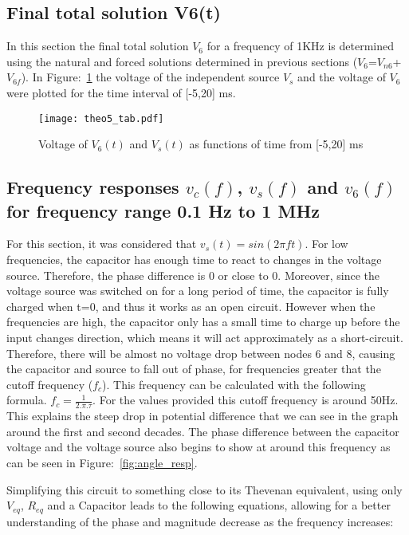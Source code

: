 \pagebreak
\subsection{Final total solution V6(t)}
In this section the final total solution $V_6$ for a frequency of 1KHz is determined using the natural and forced solutions determined in previous sections ($V_6$=$V_{n6}$+$V_{6f}$). In {Figure:~\ref{fig:theo5}} the voltage of the independent source $V_{s}$ and the voltage of $V_{6}$ were plotted for the time interval of [-5,20] ms. 
\begin{figure}[H] \centering
\texttt{[image: theo5\_tab.pdf]}
\vspace{10px}
\caption{Voltage of $V_{6}(t)$ and $V_{s}(t)$ as functions of time from [-5,20] ms}
\label{fig:theo5}
\end{figure}

\subsection{Frequency responses $v_c(f)$, $v_s(f)$ and $v_6(f)$ for frequency range 0.1 Hz to 1 MHz}
\label{ref}
For this section, it was considered that $v_s( t) = sin( 2 \pi f t )$. 
For low frequencies, the capacitor has enough time to react to changes in the voltage source. Therefore, the phase difference is 0 or close to 0. Moreover, since the voltage source was switched on for a long period of time, the capacitor is fully charged when t=0, and thus it works as an open circuit. However when the frequencies are high, the capacitor only has a small time to charge up before the input changes direction, which means it will act approximately as a short-circuit. Therefore, there will be almost no 
voltage drop between nodes 6 and 8, causing the capacitor and source to fall out of phase, for frequencies greater that the cutoff frequency ($f_c$). 
This frequency can be calculated with the following formula. $f_c = \frac{1}{2.\pi.\tau}$.  
For the values provided this cutoff frequency is around 50Hz. This explains the steep drop 
in potential difference that we can see in the graph around the first and second decades.
The phase difference between the capacitor voltage and the voltage source also begins to 
show at around this frequency as can be seen in {Figure:~\ref{fig:angle_resp}}.\par
Simplifying this circuit to something close to its Thevenan equivalent, using only $V_{eq}$, $R_{eq}$ and a Capacitor leads to the following equations, allowing for a better understanding of the phase and magnitude decrease as the frequency increases:


